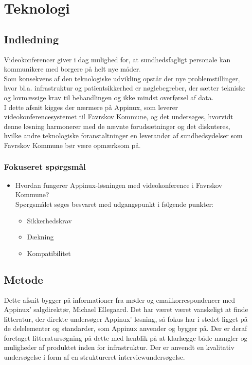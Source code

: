 \chapter{Teknologi}
\section{Indledning}

Videokonferencer giver i dag mulighed for, at sundhedsfagligt personale kan kommunikere med borgere på helt nye måder.
\\
Som konsekvens af den teknologiske udvikling opstår der nye problemstillinger, hvor bl.a. infrastruktur og patientsikkerhed er nøglebegreber, der sætter tekniske og lovmæssige krav til behandlingen og ikke mindst overførsel af data.
\\
I dette afsnit kigges der nærmere på Appinux, som leverer videokonferencesystemet til Favrskov Kommune, og det undersøges, hvorvidt denne løsning harmonerer med de nævnte forudsætninger og det diskuteres, hvilke andre teknologiske foranstaltninger en leverandør af sundhedsydelser som Favrskov Kommune bør være opmærksom på.

\subsection{Fokuseret spørgsmål}
\begin{itemize}
	\item Hvordan fungerer Appinux-løsningen med videokonference i Favrskov Kommune? \\Spørgsmålet søges besvaret med udgangspunkt i følgende punkter:
	\begin{itemize}
	\item Sikkerhedskrav
	\item Dækning 
	\item Kompatibilitet 
\end{itemize}
\end{itemize}


\section{Metode}
Dette afsnit bygger på informationer fra møder og emailkorrespondencer med Appinux' salgdirektør, Michael Ellegaard. Det har været været vanskeligt at finde litteratur, der direkte undersøger Appinux' løsning, så fokus har i stedet ligget på de delelementer og standarder, som Appinux anvender og bygger på. Der er deraf foretaget litteratursøgning på dette med henblik på at klarlægge både mangler og muligheder af produktet inden for infrastruktur. Der er anvendt en kvalitativ undersøgelse i form af en struktureret interviewundersøgelse.

